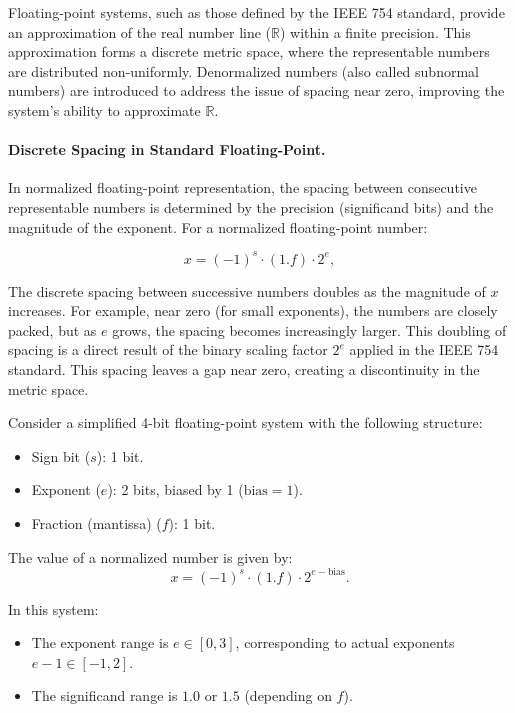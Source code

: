 Floating-point systems, such as those defined by the IEEE 754 standard, provide an approximation of the real number line (\( \mathbb{R} \)) within a finite precision. This approximation forms a discrete metric space, where the representable numbers are distributed non-uniformly. Denormalized numbers (also called subnormal numbers) are introduced to address the issue of spacing near zero, improving the system's ability to approximate \( \mathbb{R} \).

\paragraph{Discrete Spacing in Standard Floating-Point.}

In normalized floating-point representation, the spacing between consecutive representable numbers is determined by the precision (significand bits) and the magnitude of the exponent. For a normalized floating-point number:

\[
x = (-1)^s \cdot (1.f) \cdot 2^e,
\]

The discrete spacing between successive numbers doubles as the magnitude of \( x \) increases. For example, near zero (for small exponents), the numbers are closely packed, but as \( e \) grows, the spacing becomes increasingly larger. This doubling of spacing is a direct result of the binary scaling factor \( 2^e \) applied in the IEEE 754 standard. This spacing leaves a gap near zero, creating a discontinuity in the metric space.

\vspace{\baselineskip}\par
\noindent Consider a simplified 4-bit floating-point system with the following structure:
\begin{itemize}
    \item Sign bit (\( s \)): 1 bit.
    \item Exponent (\( e \)): 2 bits, biased by 1 (\( \text{bias} = 1 \)).
    \item Fraction (mantissa) (\( f \)): 1 bit.
\end{itemize}

The value of a normalized number is given by:
\[
x = (-1)^s \cdot (1.f) \cdot 2^{e - \text{bias}}.
\]

In this system:
\begin{itemize}
    \item The exponent range is \( e \in [0, 3] \), corresponding to actual exponents \( e - 1 \in [-1, 2] \).
    \item The significand range is \( 1.0 \) or \( 1.5 \) (depending on \( f \)).
\end{itemize}

